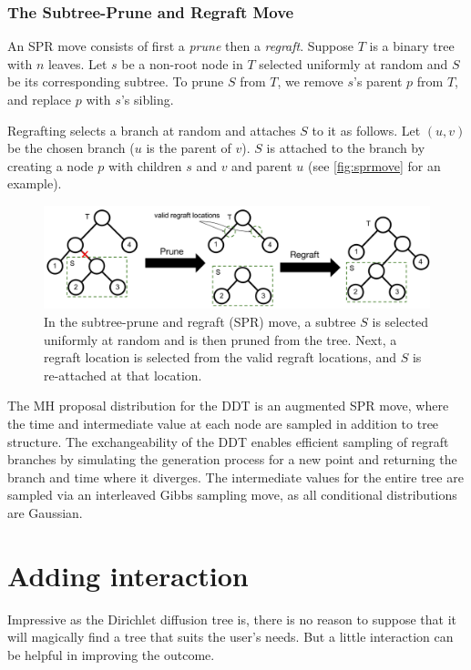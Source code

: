\subsubsection*{The Subtree-Prune and Regraft Move}
\label{app:sprsampler}
An SPR move consists of first a \emph{prune} then a \emph{regraft}.
Suppose $T$ is a binary tree with $n$ leaves.
Let $s$ be a non-root node in $T$ 
selected uniformly at random and
$S$ be its corresponding subtree.
To prune $S$ from $T$, we 
remove $s$'s parent $p$
from $T$, and replace $p$ with $s$'s sibling.

Regrafting selects a branch at random
and attaches $S$ to it as follows. 
Let $(u, v)$ be the chosen branch ($u$ is the parent of $v$).
$S$ is attached to the branch by creating a node
$p$ with children $s$ and $v$ and parent $u$ 
(see \autoref{fig:sprmove} for an example).

\begin{figure}[htp!]
    \centering
    \includegraphics[width=\textwidth]{img/SPRMove}
    \caption{In the subtree-prune and regraft (SPR) move, a subtree $S$
        is selected uniformly at random and is then pruned from the tree. 
            Next, a regraft location is selected from the valid regraft locations, and $S$ is re-attached
            at that location.}
    \label{fig:sprmove}
\end{figure}

The MH proposal distribution for the DDT
is an augmented SPR move, where
the time and intermediate value at each
node are sampled in addition to tree structure.
The exchangeability of the DDT enables
efficient sampling of regraft branches by 
simulating the generation process for a new point
and returning the branch and time where it diverges.
The intermediate values for the entire
tree are sampled via an interleaved Gibbs sampling move,
as all conditional distributions are Gaussian.
\fi
\section{Adding interaction}

Impressive as the Dirichlet diffusion tree is, there is no reason to suppose that it will magically find a tree that suits the user's needs. But a little interaction can be helpful in improving the outcome.

